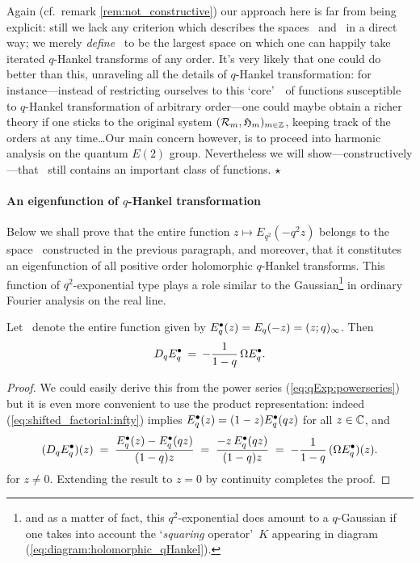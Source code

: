 \begin{remark} \rm
Again (cf.\ remark \ref{rem:not_constructive}) our approach here
is far from being explicit: still we lack any criterion which
describes the spaces \Hintersect\ and \Hcore\ in a direct way; we
merely {\em define\/} \Hcore\ to be the largest space on which one
can happily take iterated $q$-Hankel transforms of any order. It's
very likely that one could do better than this, unraveling all the
details of $q$-Hankel transformation: for instance---instead of
restricting ourselves to this \lq core\rq\ \Hcore\ of functions
susceptible to $q$-Hankel transformation of arbitrary order---one
could maybe obtain a richer theory if one sticks to the original
system $({\mathcal R}_{m},\mathfrak{H}_{m})_{m\in \mathbb{Z}}$, keeping track of the
orders at any time\ldots Our main concern however, is to proceed
into harmonic analysis on the quantum $E(2)$ group. Nevertheless
we will show---constructively---that \Hcore\ still contains an
important class of functions. $\hfill \star$
\end{remark}


\paragraph{An eigenfunction of $q$-Hankel transformation}
Below we shall prove that the entire function $z \mapsto E_{q^2}(-q^2 z)$
belongs to the space \Hcore\ constructed in the previous paragraph,
and moreover, that it constitutes an eigenfunction of all positive
order holomorphic $q$-Hankel transforms. This function of $q^2$-exponential
type plays a role similar to the
Gaussian\footnote{and as a matter of fact, this $q^2$-exponential does amount
to a $q$-Gaussian if one takes into account the \lq{\em squaring\/} operator\rq\ $K$
appearing in diagram (\ref{eq:diagram:holomorphic_qHankel}).}
in ordinary Fourier analysis on the real line.

\begin{lemma}
Let \qE\ denote the entire function given by $E_q^\bullet(z) = E_q(-z) = (z;q)_\infty$.
Then
$$ D_q E_q^\bullet \:=\: -\frac{1}{1-q}\, \Omega E_q^\bullet. $$
\end{lemma}
\begin{proof}
We could easily derive this from the power series (\ref{eq:qExp:powerseries})
but it is even more convenient to use the product representation:
indeed (\ref{eq:shifted_factorial:infty}) implies
$E_q^\bullet(z) = (1-z)E_q^\bullet(qz)$ for all $z\in \mathbb{C}$, and
$$ (D_q E_q^\bullet)(z) \;=\;  \frac{E_q^\bullet(z) - E_q^\bullet(qz)}{(1-q)z}
                \;=\; \frac{-z\,E_q^\bullet(qz)}{(1-q)z}
                \;=\; -\frac{1}{1-q} \, (\Omega E_q^\bullet)(z). $$
for $z\neq 0$. Extending the result to $z=0$ by continuity completes the proof.
\end{proof}


